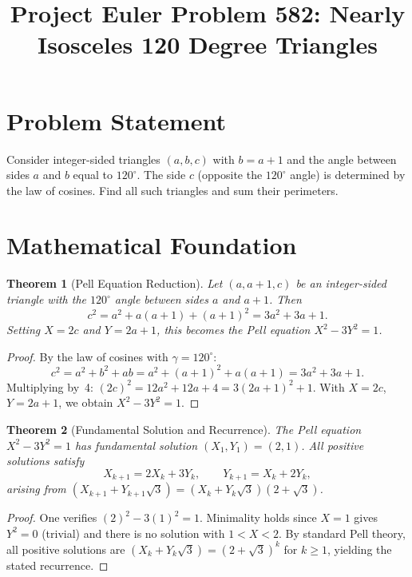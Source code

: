 \documentclass[12pt]{article}
\title{Project Euler Problem 582: Nearly Isosceles 120 Degree Triangles}
\author{}
\date{}
\newtheorem{theorem}{Theorem}
\begin{document}
\maketitle

\section{Problem Statement}

Consider integer-sided triangles $(a, b, c)$ with $b = a+1$ and the angle between sides $a$ and $b$ equal to $120^\circ$. The side $c$ (opposite the $120^\circ$ angle) is determined by the law of cosines. Find all such triangles and sum their perimeters.

\section{Mathematical Foundation}

\begin{theorem}[Pell Equation Reduction]
Let $(a, a+1, c)$ be an integer-sided triangle with the $120^\circ$ angle between sides $a$ and $a+1$. Then
\[
c^2 = a^2 + a(a+1) + (a+1)^2 = 3a^2 + 3a + 1.
\]
Setting $X = 2c$ and $Y = 2a+1$, this becomes the Pell equation $X^2 - 3Y^2 = 1$.
\end{theorem}

\begin{proof}
By the law of cosines with $\gamma = 120^\circ$:
\[
c^2 = a^2 + b^2 + ab = a^2 + (a+1)^2 + a(a+1) = 3a^2 + 3a + 1.
\]
Multiplying by~4: $(2c)^2 = 12a^2 + 12a + 4 = 3(2a+1)^2 + 1$. With $X = 2c$, $Y = 2a+1$, we obtain $X^2 - 3Y^2 = 1$.
\end{proof}

\begin{theorem}[Fundamental Solution and Recurrence]
The Pell equation $X^2 - 3Y^2 = 1$ has fundamental solution $(X_1, Y_1) = (2, 1)$. All positive solutions satisfy
\[
X_{k+1} = 2X_k + 3Y_k, \qquad Y_{k+1} = X_k + 2Y_k,
\]
arising from $(X_{k+1} + Y_{k+1}\sqrt{3}) = (X_k + Y_k\sqrt{3})(2 + \sqrt{3})$.
\end{theorem}

\begin{proof}
One verifies $(2)^2 - 3(1)^2 = 1$. Minimality holds since $X = 1$ gives $Y^2 = 0$ (trivial) and there is no solution with $1 < X < 2$. By standard Pell theory, all positive solutions are $(X_k + Y_k\sqrt{3}) = (2 + \sqrt{3})^k$ for $k \geq 1$, yielding the stated recurrence.
\end{proof}
\end{document}
